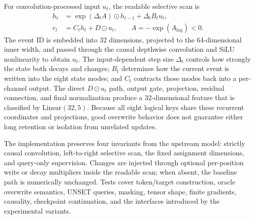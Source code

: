 \documentclass[10pt,a4paper]{article}
\begin{document}
For convolution-processed input \(u_t\), the readable selective scan is
\begin{align}
h_t &= \exp(\Delta_tA)\odot h_{t-1}+\Delta_tB_tu_t,\\
r_t &= C_th_t+D\odot u_t, \qquad A=-\exp(A_{\log})<0.
\end{align}
The event ID is embedded into 32 dimensions, projected to the 64-dimensional inner width, and passed through the causal depthwise convolution and SiLU nonlinearity to obtain \(u_t\). The input-dependent step size \(\Delta_t\) controls how strongly the state both decays and changes; \(B_t\) determines how the current event is written into the eight state modes; and \(C_t\) contracts those modes back into a per-channel output. The direct \(D\odot u_t\) path, output gate, projection, residual connection, and final normalization produce a 32-dimensional feature that is classified by \(\mathrm{Linear}(32,5)\). Because all eight logical keys share these recurrent coordinates and projections, good overwrite behavior does not guarantee either long retention or isolation from unrelated updates.

The implementation preserves four invariants from the upstream model: strictly causal convolution, left-to-right selective scan, the fixed assignment dimensions, and query-only supervision. Changes are injected through optional per-position write or decay multipliers inside the readable scan; when absent, the baseline path is numerically unchanged. Tests cover token/target construction, oracle overwrite semantics, UNSET queries, masking, tensor shape, finite gradients, causality, checkpoint continuation, and the interfaces introduced by the experimental variants.
\begin{center}
\small{}
\end{center}
\end{document}
